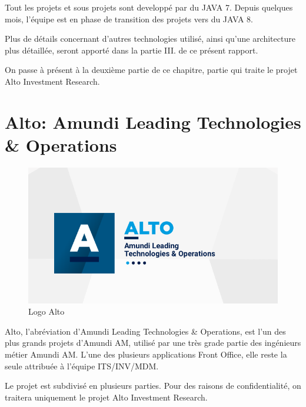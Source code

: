 \par Tout les projets et sous projets sont developpé par du JAVA 7. Depuis quelques mois, l'équipe est en phase de transition des projets vers du JAVA 8.
\par Plus de détails concernant d'autres technologies utilisé, ainsi qu'une architecture plus détaillée, seront apporté dans la partie III. de ce présent rapport.
\par On passe à présent à la deuxième partie de ce chapitre, partie qui traite le projet Alto Investment Research.
\pagebreak
\section{Alto: Amundi Leading Technologies \& Operations}
\begin{figure}[ht]
    \centering
    \includegraphics[width=\columnwidth]{img/Alto.png}
    \caption{Logo Alto}
    \label{fig:altoLogo}
\end{figure}
\par Alto, l'abréviation d'Amundi Leading Technologies \& Operations, est l'un des plus grands projets d'Amundi AM, utilisé par une très grade partie des ingénieurs métier Amundi AM. L'une des plusieurs applications Front Office, elle reste la seule attribuée à l'équipe ITS/INV/MDM.
\par Le projet est subdivisé en plusieurs parties. Pour des raisons de confidentialité, on traitera uniquement le projet Alto Investment Research.
